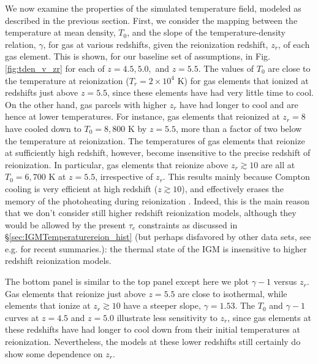 We now examine the properties of the simulated temperature field, modeled as described in the previous section. 
First, we consider the mapping between the temperature at mean density, $T_0$, and the slope of the temperature-density
relation, $\gamma$, for gas at various redshifts, given the reionization redshift, $z_r$, of each gas element. This
is shown, for our baseline set of assumptions, in Fig. \ref{fig:tden_v_zr} for each of $z=4.5,5.0,$ and $z=5.5$.
The values of $T_0$ are close to the temperature at reionization ($T_r = 2 \times 10^4$ K) for gas elements that ionized at redshifts
just above $z=5.5$, since these elements have had very little time to cool. On the other hand, gas parcels with higher $z_r$ have had longer to cool
and are hence at lower temperatures. For instance, gas elements that reionized at $z_r = 8$ have cooled down to $T_0 = 8,800$ K by
$z = 5.5$, more than a factor of two below the temperature at reionization. The temperatures of gas elements that reionize at sufficiently
high redshift, however, become insensitive to the precise redshift of reionization. In particular, gas elements that
reionize above $z_r \gtrsim 10$ are all at $T_0 = 6,700$ K at $z=5.5$, irrespective of $z_r$. This results mainly
because Compton cooling is very efficient at high redshift ($z \gtrsim 10$), and effectively erases the 
memory of the photoheating during
reionization \citep{Hui:1997dp}. Indeed, this is the main reason that we don't consider still higher redshift reionization
models, although they would be allowed by the present $\tau_e$ constraints as discussed in \S \ref{sec:IGMTemperaturereion_hist} (but perhaps disfavored by other data sets, see e.g. \citealt{Robertson:2013bq,Kuhlen:2012vy} for recent summaries.): 
the thermal state of the IGM is insensitive to higher redshift reionization models.

The bottom panel is similar to the top panel
except here we plot $\gamma-1$ versus $z_r$. Gas elements that reionize just above $z = 5.5$ are close to isothermal, while
elements that ionize at $z_r \gtrsim 10$ have a steeper slope, $\gamma = 1.53$. The $T_0$ and $\gamma-1$ curves at $z=4.5$ and $z=5.0$ illustrate
less sensitivity to $z_r$, since gas elements at these redshifts have had longer to cool down from their initial
temperatures at reionization. Nevertheless, the models at these lower redshifts still certainly do show some 
dependence on $z_r$. 

